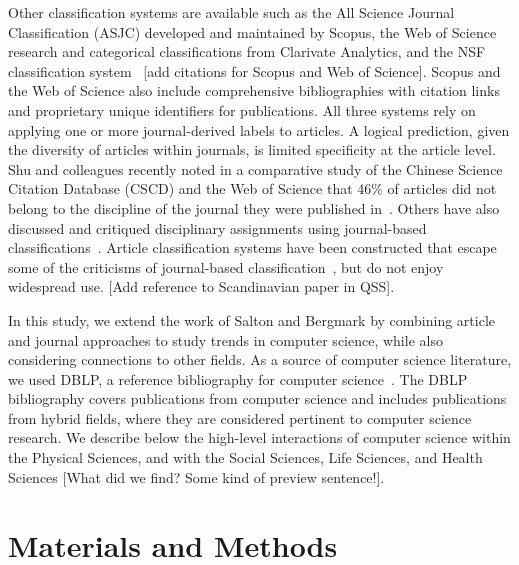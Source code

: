 Other classification systems are available such as the All Science Journal Classification (ASJC) developed and maintained by Scopus, the Web of Science research and categorical classifications from Clarivate Analytics, and the NSF classification system~\cite{nsf_classification} [add citations for Scopus and Web of Science]. Scopus and the Web of Science also include comprehensive bibliographies with citation links and proprietary unique identifiers for publications. 
All three systems rely on applying one or more journal-derived labels to articles.  
A logical prediction, given the diversity of articles within journals, is limited specificity at the article level. 
Shu and colleagues recently noted in a comparative study of the Chinese Science Citation Database (CSCD) and the Web of Science that 46\% of articles did not belong to the discipline of the journal they were published in~\cite{shu_comparing_2019}. 
Others have also discussed and critiqued disciplinary assignments using journal-based classifications~\cite{wang_large-scale_2016,perianes-rodriguez_comparison_2017}. 
Article classification systems have been constructed that escape some of the criticisms of journal-based classification~\cite{traag_louvain_2019,boyack_classification_2014,waltman_new_2012}, but do not enjoy widespread use. [Add reference to Scandinavian paper in QSS].
 
In this study, we extend the work of Salton and Bergmark by combining article and journal approaches to study trends in computer science, while also considering connections to other fields. As a source of computer science literature, we used DBLP, a reference bibliography for computer science~\cite{dblp_ref}. The DBLP bibliography covers publications from computer science and includes publications from hybrid fields, where they are considered pertinent to computer science research. We describe below the high-level interactions of computer science within the Physical Sciences, and with the Social Sciences, Life Sciences, and Health Sciences [What did we find? Some kind of preview sentence!].

\section{Materials and Methods}
\label{sec:methods}


